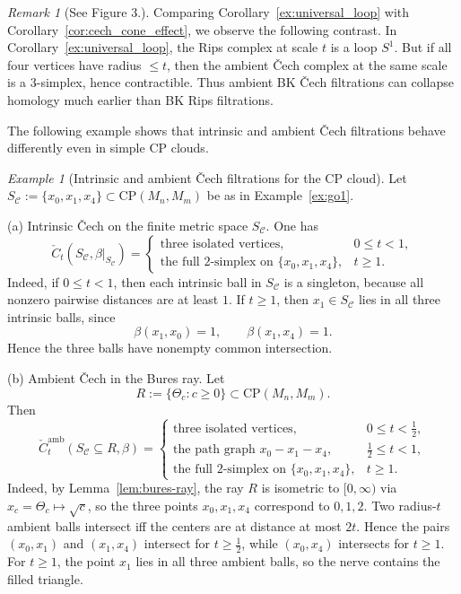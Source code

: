 \documentclass[11pt]{amsart}
\theoremstyle{definition}
\theoremstyle{remark}
\newtheorem{remark}[theorem]{Remark}
\newtheorem{example}[theorem]{Example}
\newcommand{\1}{\mathbbm{1}}
\newcommand{\CP}{\mathrm{CP}}
\begin{document}
\begin{remark}
[See Figure 3.]
Comparing Corollary~\ref{ex:universal_loop} with Corollary~\ref{cor:cech_cone_effect}, we observe the following contrast.
In Corollary~\ref{ex:universal_loop}, the Rips complex at scale $t$ is a loop $S^1$.
But if all four vertices have radius $\le t$, then the ambient \v{C}ech complex at the same scale
is a $3$-simplex, hence contractible.
Thus ambient BK \v{C}ech filtrations can collapse homology much earlier than BK Rips filtrations.
\end{remark}
The following example shows that intrinsic and ambient \v{C}ech filtrations behave differently even in simple CP clouds.
\begin{example}[Intrinsic and ambient \v{C}ech filtrations for the CP cloud]\label{prop:cp-cech}
Let $S_{\mathcal C}:=\{x_0,x_1,x_4\}\subset \CP(M_n,M_m)$ be as in Example~\ref{ex:go1}.

\smallskip\noindent
\textup{(a) Intrinsic \v{C}ech on the finite metric space $S_{\mathcal C}$.}
One has
\[
\check{C}_t(S_{\mathcal C},\beta|_{S_{\mathcal C}})
=
\begin{cases}
\text{three isolated vertices}, & 0\le t<1,\\[1mm]
\text{the full $2$-simplex on $\{x_0,x_1,x_4\}$}, & t\ge 1.
\end{cases}
\]
Indeed, if $0\le t<1$, then each intrinsic ball in $S_{\mathcal C}$ is a singleton, because all nonzero
pairwise distances are at least $1$.
If $t\ge 1$, then $x_1\in S_{\mathcal C}$ lies in all three intrinsic balls, since
\[
\beta(x_1,x_0)=1,
\qquad
\beta(x_1,x_4)=1.
\]
Hence the three balls have nonempty common intersection.

\smallskip\noindent
\textup{(b) Ambient \v{C}ech in the Bures ray.}
Let
\[
R:=\{\Theta_c:c\ge 0\}\subset \CP(M_n,M_m).
\]
Then
\[
\check{C}^{\mathrm{amb}}_t(S_{\mathcal C}\subseteq R,\beta)
=
\begin{cases}
\text{three isolated vertices}, & 0\le t<\tfrac12,\\[1mm]
\text{the path graph }x_0\!-\!x_1\!-\!x_4, & \tfrac12\le t<1,\\[1mm]
\text{the full $2$-simplex on $\{x_0,x_1,x_4\}$}, & t\ge 1.
\end{cases}
\]
Indeed, by Lemma~\ref{lem:bures-ray}, the ray $R$ is isometric to $[0,\infty)$ via $x_c=\Theta_c\mapsto \sqrt c$,
so the three points $x_0,x_1,x_4$ correspond to $0,1,2$.
Two radius-$t$ ambient balls intersect iff the centers are at distance at most $2t$.
Hence the pairs $(x_0,x_1)$ and $(x_1,x_4)$ intersect for $t\ge \tfrac12$, while $(x_0,x_4)$ intersects for $t\ge 1$.
For $t\ge 1$, the point $x_1$ lies in all three ambient balls, so the nerve contains the filled triangle.
\end{example}
\end{document}
